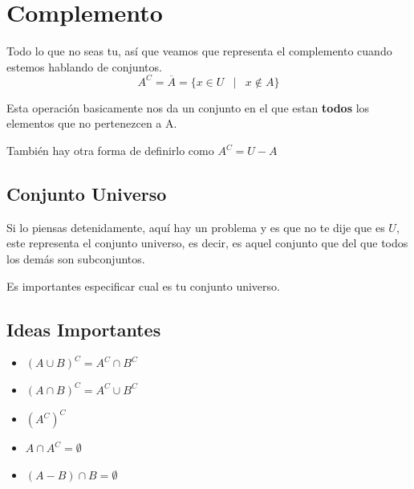 \documentclass[12pt, fleqn]{report}                             %
\DeclareMathOperator \Space     {\quad}                         %
\DeclareMathOperator \MiniSpace {\;}                            %
\newcommand \Such           {\MiniSpace | \MiniSpace}           %
\theoremstyle{break}                                            %
\begin{document}
        \clearpage
        \section{Complemento}

            Todo lo que no seas tu, así que veamos que representa el complemento cuando estemos
            hablando de conjuntos.
            \begin{equation*}
                A^C = \overline A = \{ x \in U \Such x \notin A \}
            \end{equation*}

            Esta operación basicamente nos da un conjunto en el que estan \textbf{todos} los elementos
            que no pertenezcen a A.

            También hay otra forma de definirlo como $A^C = U - A$

            \subsection{Conjunto Universo}
                Si lo piensas detenidamente, aquí hay un problema y es que no te dije que es $U$, este
                representa el conjunto universo, es decir, es aquel conjunto que del que todos los demás
                son subconjuntos.

                Es importantes especificar cual es tu conjunto universo.


            \subsection{Ideas Importantes}

                \begin{itemize}
                    \item $(A \cup B)^C = A^C \cap B^C$

                    \item $(A \cap B)^C = A^C \cup B^C$

                    \item $(A^C)^C$

                    \item $A \cap A^C = \emptyset$

                    \item $(A - B) \cap B = \emptyset$

                \end{itemize}
\end{document}
